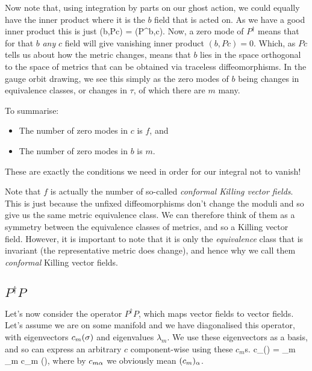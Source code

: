 Now note that, using integration by parts on our ghost action, we could equally have the inner product where it is the $b$ field that is acted on. As we have a good inner product this is just 
\bse 
    (b,Pc) = (P^{\dagger}b,c).
\ese 
Now, a zero mode of $P^{\dagger}$ means that for that $b$ \textit{any} $c$ field will give vanishing inner product $(b,Pc) = 0$. Which, as $Pc$ tells us about how the metric changes, means that $b$ lies in the space orthogonal to the space of metrics that can be obtained via traceless diffeomorphisms. In the gauge orbit drawing, we see this simply as the zero modes of $b$ being changes in equivalence classes, or changes in $\tau$, of which there are $m$ many.

To summarise:
\begin{itemize}
    \item The number of zero modes in $c$ is $f$, and 
    \item The number of zero modes in $b$ is $m$.
\end{itemize}
These are exactly the conditions we need in order for our integral not to vanish!

\br 
    Note that $f$ is actually the number of so-called \textit{conformal Killing vector fields}. This is just because the unfixed diffeomorphisms don't change the moduli and so give us the same metric equivalence class. We can therefore think of them as a symmetry between the equivalence classes of metrics, and so a Killing vector field. However, it is important to note that it is only the \textit{equivalence} class that is invariant (the representative metric does change), and hence why we call them \textit{conformal} Killing vector fields. 
\er 

\subsection{$P^{\dagger}P$}

Let's now consider the operator $P^{\dagger}P$, which maps vector fields to vector fields. Let's assume we are on some manifold and we have diagonalised this operator, with eigenvectors $c_m(\sigma)$ and eigenvalues $\lambda_m$.  We use these eigenvectors as a basis, and so can express an arbitrary $c$ component-wise using these $c_m$s. 
\bse 
    c_{\a}(\sig) = \sum_m \gamma_m c_{m\a} (\sig),
\ese 
where by $c_{m\alpha}$ we obviously mean $(c_m)_{\alpha}$. 

